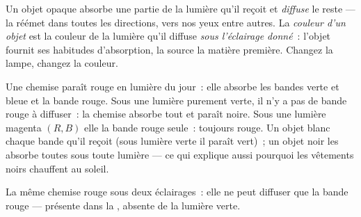 \begin{definition}\label{def:g11:color-light-sources:objectcolor}
Un objet opaque absorbe une partie de la lumière qu'il reçoit et
\emph{diffuse} le reste --- la réémet dans toutes les
directions, vers nos yeux entre autres. La \emph{couleur d'un
objet} est la couleur de la lumière qu'il
diffuse \emph{sous l'éclairage donné}~: l'objet fournit ses habitudes
d'absorption, la source la matière première. Changez la lampe, changez
la couleur.
\end{definition}

\begin{example}\label{ex:g11:color-light-sources:redshirt}
Une chemise paraît rouge en lumière du jour~: elle absorbe les bandes
verte et bleue et  la bande rouge. Sous
une lumière purement verte, il n'y a pas de bande rouge à diffuser~:
la chemise absorbe tout et paraît noire. Sous une lumière magenta
$(R, B)$ elle  la bande rouge seule~:
toujours rouge. Un objet blanc 
chaque bande qu'il reçoit (sous lumière verte il paraît vert)~; un
objet noir les absorbe toutes sous toute lumière --- ce qui explique
aussi pourquoi les vêtements noirs chauffent au soleil.
\end{example}

\begin{omfigure}
\qquad
{}

{\small La même chemise rouge sous deux éclairages~: elle ne peut
diffuser que la bande rouge --- présente dans la
, absente de la lumière verte.}
\end{omfigure}

